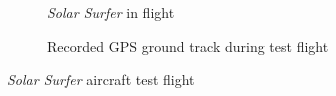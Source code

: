 \documentclass[12pt,vi,oneside,table]{report}
\begin{document}
    \begin{figure}[htbp!]
        \centering
        \begin{subfigure}[b]{0.45\textwidth}
            \caption{\emph{Solar Surfer} in flight}
            \label{fig:solar_surfer_flight}
        \end{subfigure}
        \hfill
        \begin{subfigure}[b]{0.511\textwidth}
            \caption{Recorded GPS ground track during test flight}
            \label{fig:solar_surfer_track}
        \end{subfigure}
        \caption{\emph{Solar Surfer} aircraft test flight}
        \label{fig:solar_surfer_aircraft}
    \end{figure}
\end{document}
